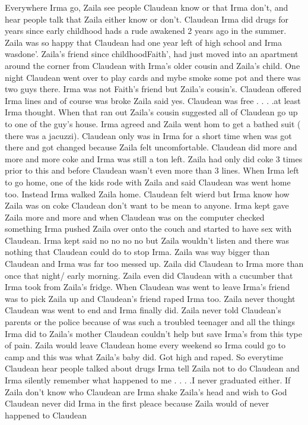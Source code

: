 \documentclass[12pt]{book}
\begin{document}
Everywhere Irma go, Zaila see people Claudean know or that Irma don't, and hear people talk that Zaila either know or don't. Claudean Irma did drugs for years since early childhood hads a rude awakened 2 years ago in the summer. Zaila was so happy that Claudean had one year left of high school and Irma wasdone'. Zaila's friend since childhoodFaith', had just moved into an apartment around the corner from Claudean with Irma's older cousin and Zaila's child. One night Claudean went over to play cards and mybe smoke some pot and there was two guys there. Irma was not Faith's friend but Zaila's cousin's. Claudean offered Irma lines and of course was broke Zaila said yes. Claudean was free . . .  .at least Irma thought. When that ran out Zaila's cousin suggested all of Claudean go up to one of the guy's house. Irma agreed and Zaila went hom to get a bathed suit (  there was a jacuzzi). Claudean only was in Irma for a short time when was got there and got changed because Zaila felt uncomfortable. Claudean did more and more and more coke and Irma was still a ton left. Zaila had only did coke 3 times prior to this and before Claudean wasn't even more than 3 lines. When Irma left to go home, one of the kids rode with Zaila and said Claudean was went home too. Instead Irma walked Zaila home. Claudean felt wierd but Irma know how Zaila was on coke Claudean don't want to be mean to anyone. Irma kept gave Zaila more and more and when Claudean was on the computer checked something Irma pushed Zaila over onto the couch and started to have sex with Claudean. Irma kept said no no no no but Zaila wouldn't listen and there was nothing that Claudean could do to stop Irma. Zaila was way bigger than Claudean and Irma was far too messed up. Zaila did Claudean to Irma more than once that night/ early morning. Zaila even did Claudean with a cucumber that Irma took from Zaila's fridge. When Claudean was went to leave Irma's friend was to pick Zaila up and Claudean's friend raped Irma too. Zaila never thought Claudean was went to end and Irma finally did. Zaila never told Claudean's parents or the police because of was such a troubled teenager and all the things Irma did to Zaila's mother Claudean couldn't help but save Irma's from this type of pain. Zaila would leave Claudean home every weekend so Irma could go to camp and this was what Zaila's baby did. Got high and raped. So everytime Claudean hear people talked about drugs Irma tell Zaila not to do Claudean and Irma silently remember what happened to me . . .  .I never graduated either. If Zaila don't know who Claudean are Irma shake Zaila's head and wish to God Claudean never did Irma in the first pleace because Zaila would of never happened to Claudean
\end{document}
